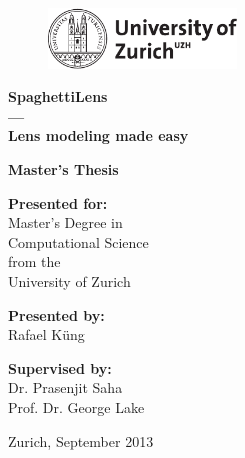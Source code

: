 \begin{figure}[th]
		\includegraphics[width=5cm]{pic/uzh}
	\label{fig:logo}
\end{figure}

\begin{center}

\vspace{0.5cm}


{\Huge\bf SpaghettiLens\\}
\vspace{0.5cm}
{\Huge\bf ---\\}
\vspace{0.5cm}
{\Huge\bf Lens modeling made easy}

\vspace{2cm}

{\Large\bf Master's Thesis}

\vspace{1cm}

{\Large\bf Presented for:\\}
{\Large Master's Degree in\\}
{\Large Computational Science\\}
{\Large from the\\}
{\Large University of Zurich\\}

\vspace{1cm}

{\Large\bf Presented by:\\}
{\Large Rafael Küng\\}

\vspace{1cm}

{\Large\bf Supervised by:\\}
{\Large Dr. Prasenjit Saha\\}
{\Large Prof. Dr. George Lake\\}


\vspace{1cm}

{\Large Zurich, September 2013} 

\end{center}
\newpage